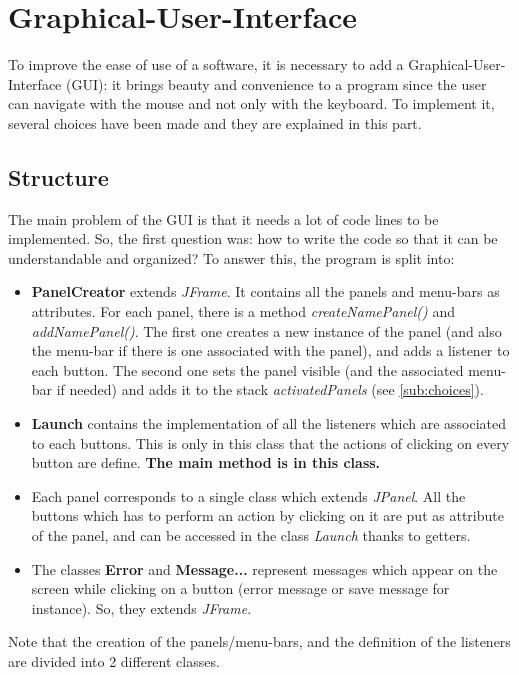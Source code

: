 \section{Graphical-User-Interface}
To improve the ease of use of a software, it is necessary to add a Graphical-User-Interface (GUI): it brings beauty and convenience to a program since the user can navigate with the mouse and not only with the keyboard. To implement it, several choices have been made and they are explained in this part.
\subsection{Structure}
\label{sub:structure}
The main problem of the GUI is that it needs a lot of code lines to be implemented. So, the first question was: how to write the code so that it can be understandable and organized?
To answer this, the program is split into:
\begin{itemize}
	\item{\textbf{PanelCreator}} extends \textit{JFrame}. It contains all the panels and menu-bars as attributes. For each panel, there is a method \textit{createNamePanel()} and \textit{addNamePanel()}. The first one creates a new instance of the panel (and also the menu-bar if there is one associated with the panel), and adds a listener to each button. The second one sets the panel visible (and the associated menu-bar if needed) and adds it to the stack \textit{activatedPanels} (see \ref{sub:choices}).
	\item{\textbf{Launch}} contains the implementation of all the listeners which are associated to each buttons. This is only in this class that the actions of clicking on every button are define. \textbf{The main method is in this class.}
	\item Each panel corresponds to a single class which extends \textit{JPanel}. All the buttons which has to perform an action by clicking on it are put as attribute of the panel, and can be accessed in the class \textit{Launch} thanks to getters.
	\item The classes \textbf{Error} and \textbf{Message...} represent messages which appear on the screen while clicking on a button (error message or save message for instance). So, they extends \textit{JFrame}.
\end{itemize}
Note that the creation of the panels/menu-bars, and the definition of the listeners are divided into 2 different classes.


